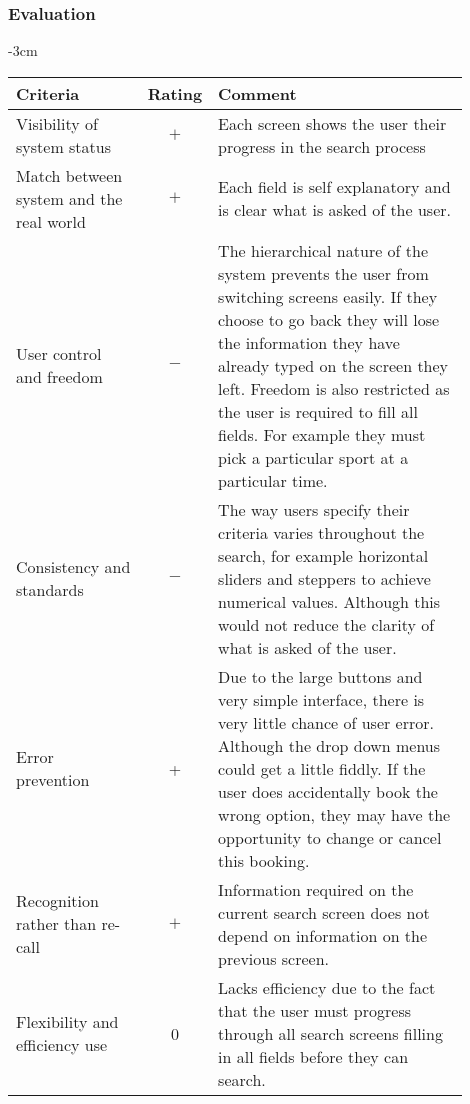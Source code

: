 \subsubsection{Evaluation}

\begin{center}
	\begin{adjustwidth*}{}{-3cm}
	\renewcommand{\arraystretch}{2}
	\begin{longtable}{@{\extracolsep{\fill}}p{0.3\linewidth} c p{0.6\linewidth}}
		\toprule
		\textbf{Criteria} & \textbf{Rating} & \textbf{Comment}\\
		\midrule
		Visibility of system status & $+$ & Each screen shows the user their
		progress in the search process \\

		Match between system and the real world & $+$ & Each field is self
		explanatory and is clear what is asked of the user.  \\

		User control and freedom & $-$ & The hierarchical nature of the system
		prevents the user from switching screens easily. If they choose to go
		back they will lose the information they have already typed on the
		screen they left. Freedom is also restricted as the user is required to
		fill all fields. For example they must pick a particular sport at a
		particular time. \\

		Consistency and standards & $-$ & The way users specify their criteria
		varies throughout the search, for example horizontal sliders and
		steppers to achieve numerical values. Although this would not reduce
		the clarity of what is asked of the user. \\

		Error prevention & + & Due to the large buttons and very simple
		interface, there is very little chance of user error. Although the drop
		down menus could get a little fiddly. If the user does accidentally
		book the wrong option, they may have the opportunity to change or
		cancel this booking. \\

		Recognition rather than re-call & $+$ & Information required on the
		current search screen does not depend on information on the previous
		screen. \\

		Flexibility and efficiency use & 0 & Lacks efficiency due to the fact
		that the user must progress through all search screens filling in all
		fields before they can search. \\


\end{longtable}
\end{adjustwidth*}
\end{center}
